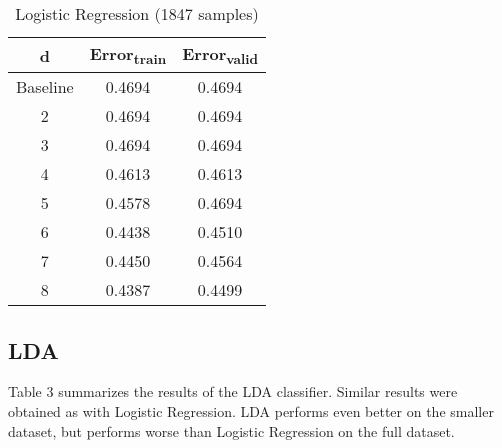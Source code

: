 \documentclass[conference,letterpaper]{IEEEtran}
\begin{document}
\begin{table}[h]
\renewcommand{\arraystretch}{1.2}
\renewcommand{\thefootnote}{\alph{footnote}}
\caption{Logistic Regression (1847 samples)} \label{table2}
\begin{minipage} {0.5\textwidth}
\begin{center}
    \begin{tabular}{ | c | c | c |}
    \hline
    d & Error\textsubscript{train} & Error\textsubscript{valid} \\ \hline
    Baseline & 0.4694 & 0.4694 \\ \hline
    2 & 0.4694 & 0.4694 \\ \hline
    3 & 0.4694 & 0.4694 \\ \hline
    4 & 0.4613 & 0.4613 \\ \hline
    5 & 0.4578 & 0.4694 \\ \hline
    6 & 0.4438 & 0.4510 \\ \hline
    7 & 0.4450 & 0.4564 \\ \hline
    8 & 0.4387 & 0.4499 \\ \hline
    \end{tabular}
\end{center}
\end{minipage}
\end{table}

\subsection{LDA}

Table 3 summarizes the results of the LDA classifier. Similar results were obtained as with Logistic Regression. LDA performs even better on the smaller dataset,
but performs worse than Logistic Regression on the full dataset. \\
\end{document}
